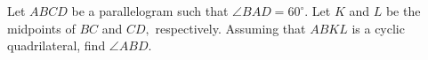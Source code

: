 Let $ABCD$ be a parallelogram such that $\angle BAD = 60^{\circ}.$ Let $K$ and $L$ be the midpoints of $BC$ and $CD,$ respectively. Assuming that $ABKL$ is a cyclic quadrilateral, find $\angle ABD.$